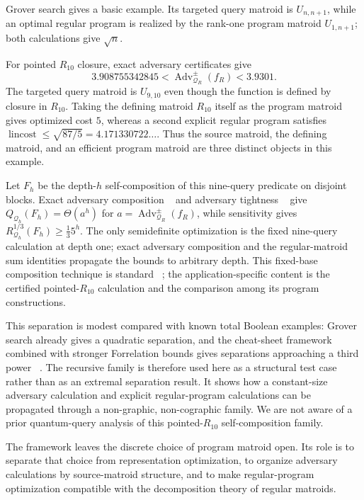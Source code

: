 \documentclass[11pt]{article}
\numberwithin{equation}{section}
\theoremstyle{remark}
\begin{document}
Grover search gives a basic example. Its targeted query matroid is
$U_{n,n+1}$, while an optimal regular program is realized by the rank-one
program matroid $U_{1,n+1}$; both calculations give $\sqrt n$.

For pointed $R_{10}$ closure, exact adversary certificates give
\[
    3.908755342845<
    \operatorname{Adv}^{\pm}_{\mathcal Q_R}(f_R)<3.9301.
\]
The targeted query matroid is $U_{9,10}$ even though the function is defined
by closure in $R_{10}$. Taking the defining matroid $R_{10}$ itself as the
program matroid gives optimized cost $5$, whereas a second explicit regular
program satisfies
$\operatorname{lincost}\leq\sqrt{87/5}=4.171330722\ldots$.
Thus the source matroid, the defining matroid, and an efficient program
matroid are three distinct objects in this example.

Let $F_h$ be the depth-$h$ self-composition of this nine-query predicate on
disjoint blocks. Exact adversary composition
~\cite{HoyerLeeSpalek2007,Reichardt2009} and adversary tightness
~\cite{Reichardt2011,Reichardt2014Equivalent} give
$Q_{\mathcal Q_h}(F_h)=\Theta(a^h)$ for
$a=\operatorname{Adv}^{\pm}_{\mathcal Q_R}(f_R)$, while sensitivity gives
$R^{1/3}_{\mathcal Q_h}(F_h)\geq\frac13 5^h$. The only semidefinite
optimization is the fixed nine-query calculation at depth one; exact
adversary composition and the regular-matroid sum identities propagate the
bounds to arbitrary depth. This fixed-base composition technique is standard
~\cite{ReichardtSpalek2008,Reichardt2009}; the application-specific content
is the certified pointed-$R_{10}$ calculation and the comparison among its
program constructions.

This separation is modest compared with known total Boolean examples:
Grover search already gives a quadratic separation, and the cheat-sheet
framework combined with stronger Forrelation bounds gives separations
approaching a third power
~\cite{AaronsonBenDavidKothari2016,SherstovStorozhenkoWu2023}. The recursive
family is therefore used here as a structural test case rather than as an
extremal separation result. It shows how a constant-size adversary
calculation and explicit regular-program calculations can be propagated
through a non-graphic, non-cographic family. We are not aware of a prior
quantum-query analysis of this pointed-$R_{10}$ self-composition family.

The framework leaves the discrete choice of program matroid open. Its role is
to separate that choice from representation optimization, to organize
adversary calculations by source-matroid structure, and to make
regular-program optimization compatible with the decomposition theory of
regular matroids.
\end{document}
